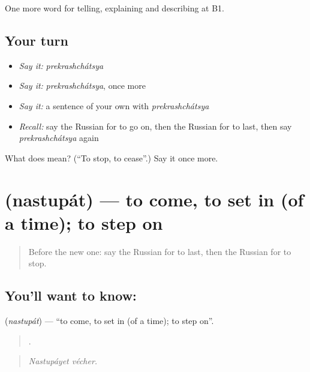 \begin{grammarlens}[title={What you've built}]
One more word for telling, explaining and describing at B1.
\end{grammarlens}

\subsection*{Your turn}
\begin{itemize}
\raggedright
  \item \emph{Say it:} \emph{prekrashchátsya}
  \item \emph{Say it:} \emph{prekrashchátsya}, once more
  \item \emph{Say it:} a sentence of your own with \emph{prekrashchátsya}
  \item \emph{Recall:} say the Russian for to go on, then the Russian for to last, then say \emph{prekrashchátsya} again
\end{itemize}

\begin{tcolorbox}[breakable,colback=teal!4,colframe=teal!35!black,title={Before you move on}]
What does  mean? (\textquotedblleft{}To stop, to cease\textquotedblright{}.) Say it once more.
\end{tcolorbox}
\section[\texorpdfstring{\ru{наступать} (nastupát)}{наступать (nastupát)}]{ (nastupát) — to come, to set in (of a time); to step on}

\label{lesson:RU-C273-nastupat}



\begin{quote}
Before the new one: say the Russian for to last, then the Russian for to stop.
\end{quote}

\subsection*{You'll want to know: }
\textbf{} (\emph{nastupát}) — \textquotedblleft{}to come, to set in (of a time); to step on\textquotedblright{}.

\begin{quote}
 .
\end{quote}

\begin{quote}
\emph{Nastupáyet vécher.}
\end{quote}

